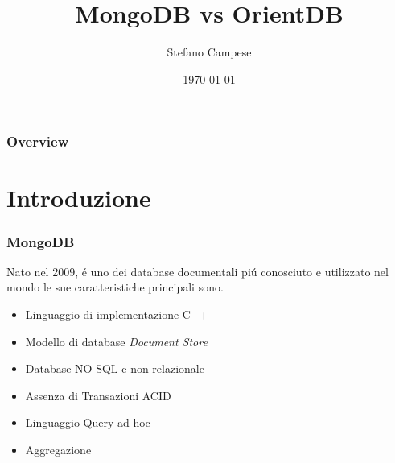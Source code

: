 \documentclass{beamer}
\title[MongoDB vs OrientDB]{MongoDB vs OrientDB} %
\author{Stefano Campese} %
\date{\today} %
\begin{document}
\begin{frame}
\titlepage %
\end{frame}

\begin{frame}
\frametitle{Overview} %
\tableofcontents %
\end{frame}


\section{Introduzione} %


\begin{frame}
\frametitle{MongoDB}
Nato nel 2009, \'e uno dei database documentali pi\'u conosciuto e utilizzato nel mondo le sue caratteristiche principali sono.
\begin{itemize}
\item Linguaggio di implementazione C++
\item Modello di database \emph{Document Store}
\item Database NO-SQL e non relazionale
\item Assenza di Transazioni ACID
\item Linguaggio Query ad hoc
\item Aggregazione
\end{itemize}
\end{frame}
\end{document}
